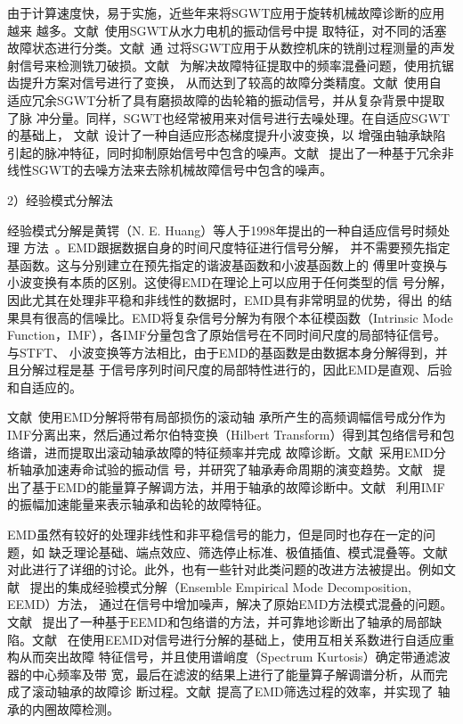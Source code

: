 由于计算速度快，易于实施，近些年来将SGWT应用于旋转机械故障诊断的应用越来
越多。文献~使用SGWT从水力电机的振动信号中提
取特征，对不同的活塞故障状态进行分类。文献~通
过将SGWT应用于从数控机床的铣削过程测量的声发射信号来检测铣刀破损。文献~
为解决故障特征提取中的频率混叠问题，使用抗锯齿提升方案对信号进行了变换，
从而达到了较高的故障分类精度。文献~使用自
适应冗余SGWT分析了具有磨损故障的齿轮箱的振动信号，并从复杂背景中提取了脉
冲分量。同样，SGWT也经常被用来对信号进行去噪处理。在自适应SGWT的基础上，
文献~设计了一种自适应形态梯度提升小波变换，以
增强由轴承缺陷引起的脉冲特征，同时抑制原始信号中包含的噪声。文献~
提出了一种基于冗余非线性SGWT的去噪方法来去除机械故障信号中包含的噪声。

2）经验模式分解法

经验模式分解是黄锷（N. E. Huang）等人于1998年提出的一种自适应信号时频处理
方法~\cite{huang1998empirical}。EMD跟据数据自身的时间尺度特征进行信号分解，
并不需要预先指定基函数。这与分别建立在预先指定的谐波基函数和小波基函数上的
傅里叶变换与小波变换有本质的区别。这使得EMD在理论上可以应用于任何类型的信
号分解，因此尤其在处理非平稳和非线性的数据时，EMD具有非常明显的优势，得出
的结果具有很高的信噪比。EMD将复杂信号分解为有限个本征模函数（Intrinsic Mode
Function，IMF），各IMF分量包含了原始信号在不同时间尺度的局部特征信号。与STFT、
小波变换等方法相比，由于EMD的基函数是由数据本身分解得到，并且分解过程是基
于信号序列时间尺度的局部特性进行的，因此EMD是直观、后验和自适应的。

文献~使用EMD分解将带有局部损伤的滚动轴
承所产生的高频调幅信号成分作为IMF分离出来，然后通过希尔伯特变换（Hilbert
Transform）得到其包络信号和包络谱，进而提取出滚动轴承故障的特征频率并完成
故障诊断。文献~采用EMD分析轴承加速寿命试验的振动信
号，并研究了轴承寿命周期的演变趋势。文献~
提出了基于EMD的能量算子解调方法，并用于轴承的故障诊断中。文献~
利用IMF的振幅加速能量来表示轴承和齿轮的故障特征。

EMD虽然有较好的处理非线性和非平稳信号的能力，但是同时也存在一定的问题，如
缺乏理论基础、端点效应、筛选停止标准、极值插值、模式混叠等。文献~
对此进行了详细的讨论。此外，也有一些针对此类问题的改进方法被提出。例如文献~
提出的集成经验模式分解（Ensemble Empirical Mode Decomposition, EEMD）方法，
通过在信号中增加噪声，解决了原始EMD方法模式混叠的问题。文献~
提出了一种基于EEMD和包络谱的方法，并可靠地诊断出了轴承的局部缺陷。文献~
在使用EEMD对信号进行分解的基础上，使用互相关系数进行自适应重构从而突出故障
特征信号，并且使用谱峭度（Spectrum Kurtosis）确定带通滤波器的中心频率及带
宽，最后在滤波的结果上进行了能量算子解调谱分析，从而完成了滚动轴承的故障诊
断过程。文献~提高了EMD筛选过程的效率，并实现了
轴承的内圈故障检测。

